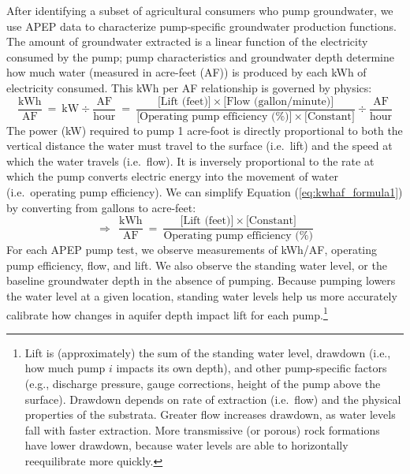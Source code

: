 After identifying a subset of agricultural consumers who pump groundwater, we use APEP data to characterize pump-specific groundwater production functions. 
The amount of groundwater extracted is a linear function of the electricity consumed by the pump; pump characteristics and groundwater depth determine how much water (measured in acre-feet (AF)) is produced by each kWh of electricity consumed.
This kWh per AF relationship is governed by physics:
\begin{equation}
\frac{\text{kWh}}{\text{AF}} ~=~ \text{kW} \div \frac{\text{AF}}{\text{hour}} 
 ~=~ \frac{\big[\text{Lift (feet)} \big]\times \big[\text{Flow (gallon/minute)}\big]}{\big[\text{Operating pump efficiency (\%)}\big] \times \big[\text{Constant}\big]} \div \frac{\text{AF}}{\text{hour}} 
\label{eq:kwhaf_formula1}
\end{equation}
The power (kW) required to pump 1 acre-foot is directly proportional to both the vertical distance the water must travel to the surface (i.e.\ lift) and the speed at which the water travels (i.e.\ flow). It is inversely proportional to the rate at which the pump converts electric energy into the movement of water (i.e.\ operating pump efficiency). We can simplify Equation (\ref{eq:kwhaf_formula1}) by converting from gallons to acre-feet: 
\begin{equation}
\Rightarrow~~\frac{\text{kWh}}{\text{AF}} ~=~ \frac{\big[\text{Lift (feet)} \big] \times \big[\text{Constant}\big]}{\text{Operating pump efficiency (\%)}} 
\label{eq:kwhaf_formula2}
\end{equation}
For each APEP pump test, we observe measurements of kWh/AF, operating pump efficiency, flow, and lift. We also observe the standing water level, or the baseline groundwater depth in the absence of pumping. Because pumping lowers the water level at a given location, standing water levels help us more accurately calibrate how changes in aquifer depth impact lift for each pump.\footnote{
Lift is (approximately) the sum of the standing water level, drawdown (i.e., how much pump $i$ impacts its own depth), and other pump-specific factors (e.g., discharge pressure, gauge corrections, height of the pump above the surface).
Drawdown depends on rate of extraction (i.e.\ flow) and the physical properties of the substrata. Greater flow increases drawdown, as water levels fall with faster extraction. More transmissive (or porous) rock formations have lower drawdown, because water levels are able to horizontally reequilibrate  more quickly.
}


